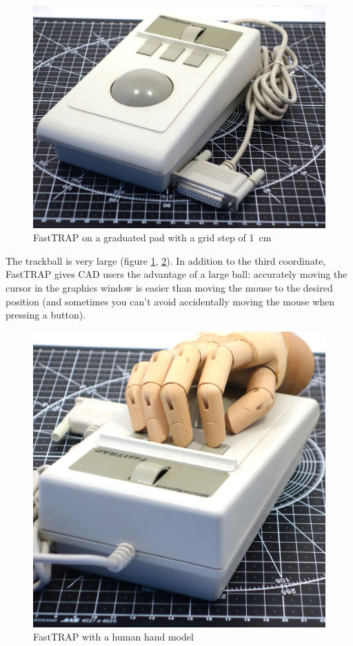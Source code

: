 \documentclass[11pt, a4paper]{article}
\begin{document}
\begin{figure}[h]
   \centering
    \includegraphics[scale=0.4]{1987_microspeed_fasttrap/size_15.jpg}
    \caption{FastTRAP on a graduated pad with a grid step of 1~cm}
    \label{fig:FastTRAPSize}
\end{figure}

The trackball is very large (figure \ref{fig:FastTRAPSize}, \ref{fig:FastTRAPHand}). In addition to the third coordinate, FastTRAP gives CAD users the advantage of a large ball: accurately moving the cursor in the graphics window is easier than moving the mouse to the desired position (and sometimes you can't avoid accidentally moving the mouse when pressing a button).

\begin{figure}[h]
    \centering
    \includegraphics[scale=0.3]{1987_microspeed_fasttrap/hand_15.jpg}
    \caption{FastTRAP with a human hand model}
    \label{fig:FastTRAPHand}
\end{figure}
\end{document}
